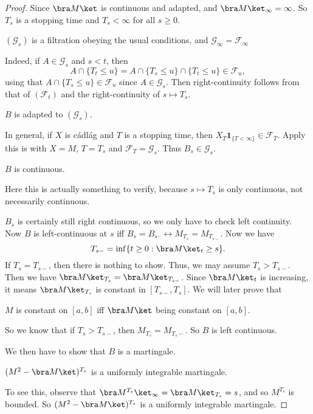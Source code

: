 \documentclass[a4paper]{article}
\begin{document}
\begin{proof}
  Since $\bra M\ket$ is continuous and adapted, and $\bra M\ket_\infty = \infty$. So $T_s$ is a stopping time and $T_s < \infty$ for all $s \geq 0$.
  \begin{claim}
    $(\mathcal{G}_s)$ is a filtration obeying the usual conditions, and $\mathcal{G}_\infty = \mathcal{F}_\infty$
  \end{claim}
  Indeed, if $A \in \mathcal{G}_s$ and $s < t$, then
  \[
    A \cap \{T_t \leq u\} = A \cap \{T_s \leq u\} \cap \{T_t \leq u\} \in \mathcal{F}_u,
  \]
  using that $A \cap \{T_s \leq u\} \in \mathcal{F}_u$ since $A \in \mathcal{G}_s$. Then right-continuity follows from that of $(\mathcal{F}_t)$ and the right-continuity of $s \mapsto T_s$.

  \begin{claim}
    $B$ is adapted to $(\mathcal{G}_s)$.
  \end{claim}
  In general, if $X$ is c\'adl\'ag and $T$ is a stopping time, then $X_T \mathbf{1}_{\{T < \infty\}} \in \mathcal{F}_T$. Apply this is with $X = M$, $T = T_s$ and $\mathcal{F}_T = \mathcal{G}_s$. Thus $B_s \in \mathcal{G}_s$.

  \begin{claim}
    $B$ is continuous.
  \end{claim}
  Here this is actually something to verify, because $s \mapsto T_s$ is only continuous, not necessarily continuous.

  $B_s$ is certainly still right continuous, so we only have to check left continuity. Now $B$ is left-continuous at $s$ iff $B_s = B_{s^-} \leftrightarrow M_{T_s} = M_{T_{s-}}$.
  Now we have
  \[
    T_{s-} = \inf \{t \geq 0 : \bra M\ket_t \geq s\}.
  \]
  If $T_s = T_{s-}$, then there is nothing to show. Thus, we may assume $T_s > T_{s-}$. Then we have $\bra M\ket_{T_s} = \bra M\ket_{T_{s-}}$. Since $\bra M\ket_t$ is increasing, it means $\bra M\ket_{T_s}$ is constant in $[T_{s-}, T_s]$. We will later prove that
  \begin{lemma}
    $M$ is constant on $[a, b]$ iff $\bra M\ket$ being constant on $[a, b]$.
  \end{lemma}
  So we know that if $T_s > T_{s-}$, then $M_{T_s} = M_{T_s-}$. So $B$ is left continuous.

  We then have to show that $B$ is a martingale.
  \begin{claim}
    $(M^2 - \bra M\ket)^{T_s}$ is a uniformly integrable martingale.
  \end{claim}
  To see this, observe that $\bra M^{T_s}\ket_\infty = \bra M\ket_{T_s} = s$, and so $M^{T_s}$ is bounded. So $(M^2 - \bra M\ket)^{T_s}$ is a uniformly integrable martingale.


\end{proof}
\end{document}
